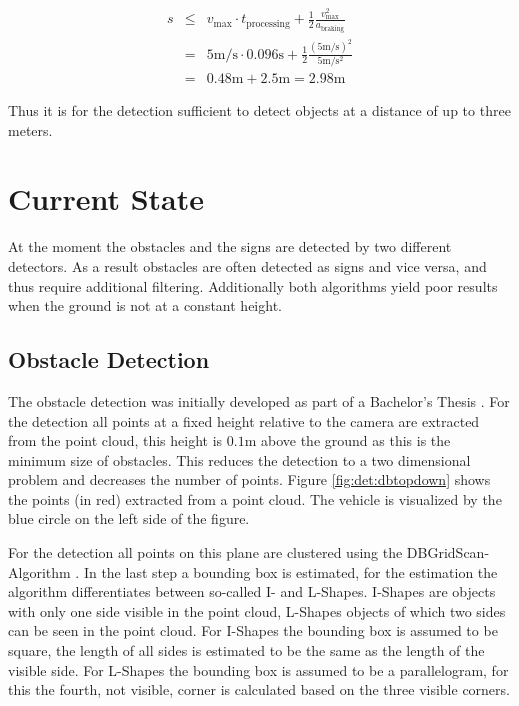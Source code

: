 \begin{eqnarray}
    s &\leq& v_\text{max} \cdot t_\text{processing} + \frac{1}{2} \frac{v_\text{max}^2}{a_\text{braking}} \\
    &=& 5 \si{\m \per \s} \cdot 0.096 \si{\s} 
        + \frac{1}{2} \frac{{(5\si{\m \per \s})}^2}{5 \si{\m \per \square \s}} \nonumber \\
    &=& 0.48 \si{\m} + 2.5 \si{\m} = 2.98 \si{\m} \nonumber
\end{eqnarray}

Thus it is for the detection sufficient to detect objects at a distance of up to three meters. 

\section{Current State}
At the moment the obstacles and the signs are detected by two different detectors. As a result obstacles are often detected as signs and vice versa, and thus require additional filtering. Additionally both algorithms yield poor results when the ground is not at a constant height.

\subsection{Obstacle Detection} \label{sec:det:obstDet}
The obstacle detection was initially developed as part of a Bachelor's Thesis \cite{marceldebout2012}.
For the detection all points at a fixed height relative to the camera are extracted from the point cloud, this height is $0.1\si{\m}$ above the ground as this is the minimum size of obstacles. This reduces the detection to a two dimensional problem and decreases the number of points.
Figure \ref{fig:det:dbtopdown} shows the points (in red) extracted from a point cloud. The vehicle is visualized by the blue circle on the left side of the figure.

For the detection all points on this plane are clustered using the DBGridScan-Algorithm \cite{danielmeisner2016}. 
In the last step a bounding box is estimated, for the estimation the algorithm differentiates between so-called I- and L-Shapes. 
I-Shapes are objects with only one side visible in the point cloud, L-Shapes objects of which two sides can be seen in the point cloud.
For I-Shapes the bounding box is assumed to be square, the length of all sides is estimated to be the same as the length of the visible side. 
For L-Shapes the bounding box is assumed to be a parallelogram, for this the fourth, not visible, corner is calculated based on the three visible corners.

